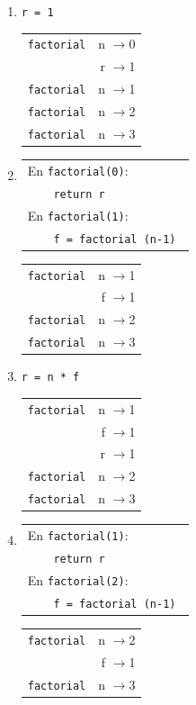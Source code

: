 \begin{enumerate}
\item  \verb|r = 1                     | 
	\begin{tabular}{r|r|}
	\hline
	\verb|factorial|&n $\rightarrow$0\\
	          &r $\rightarrow$1\\
	\hline
	\hline
	\verb|factorial|&n $\rightarrow$1\\
	\hline
	\hline
	\verb|factorial|&n $\rightarrow$2\\
	\hline
	\hline
	\verb|factorial|&n $\rightarrow$3\\
	\hline
	\end{tabular}

\item
\begin{tabular}{l}
En \lstinline!factorial(0)!: \\ \verb|    return r| \\
En \lstinline!factorial(1)!: \\ \verb|    f = factorial (n-1) |
\end{tabular}
	\begin{tabular}{r|r|}
	\hline
	\verb|factorial|&n $\rightarrow$1\\
	&f $\rightarrow$1\\
	\hline
	\hline
	\verb|factorial|&n $\rightarrow$2\\
	\hline
	\hline
	\verb|factorial|&n $\rightarrow$3\\
	\hline
	\end{tabular}

\item  \verb|r = n * f                 | 
\begin{tabular}{r|r|}
\hline
\verb|factorial|&n $\rightarrow$1\\
  &f $\rightarrow$1\\
  &r $\rightarrow$1\\
\hline
\hline
\verb|factorial|&n $\rightarrow$2\\
\hline
\hline
\verb|factorial|&n $\rightarrow$3\\
\hline
\end{tabular}

\item
\begin{tabular}{l}
En \lstinline!factorial(1)!: \\ \verb|    return r| \\
En \lstinline!factorial(2)!: \\ \verb|    f = factorial (n-1) |
\end{tabular}
	\begin{tabular}{r|r|}
	\hline
	\verb|factorial|&n $\rightarrow$2\\
	&f $\rightarrow$1\\
	\hline
	\hline
	\verb|factorial|&n $\rightarrow$3\\
	\hline
	\end{tabular}


\end{enumerate}
